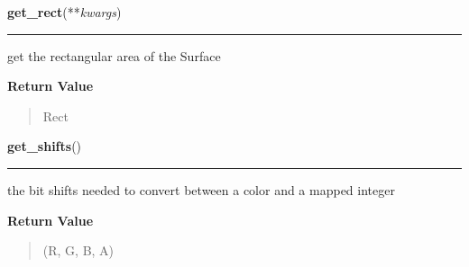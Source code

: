 \hspace{.8\funcindent}\begin{boxedminipage}{\funcwidth}

    \raggedright \textbf{get\_rect}(**\textit{kwargs})

    \vspace{-1.5ex}

    \rule{\textwidth}{0.5\fboxrule}
\setlength{\parskip}{2ex}
    get the rectangular area of the Surface

\setlength{\parskip}{1ex}
      \textbf{Return Value}
    \vspace{-1ex}

      \begin{quote}
      Rect

      \end{quote}

    \end{boxedminipage}

    \label{pygame:Surface:get_shifts}

    \vspace{0.5ex}

\hspace{.8\funcindent}\begin{boxedminipage}{\funcwidth}

    \raggedright \textbf{get\_shifts}()

    \vspace{-1.5ex}

    \rule{\textwidth}{0.5\fboxrule}
\setlength{\parskip}{2ex}
    the bit shifts needed to convert between a color and a mapped integer

\setlength{\parskip}{1ex}
      \textbf{Return Value}
    \vspace{-1ex}

      \begin{quote}
      (R, G, B, A)

      \end{quote}

    \end{boxedminipage}

    \label{pygame:Surface:get_size}

    \vspace{0.5ex}

